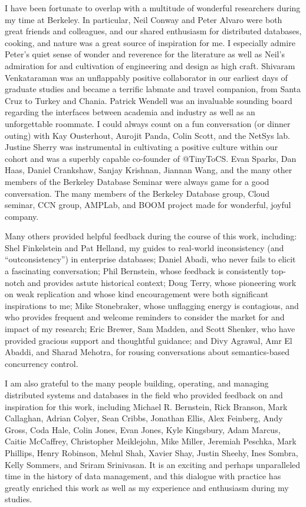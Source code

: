 \documentclass[12pt]{myucthesis}
\begin{document}
\begin{frontmatter}
\begin{acknowledgements}
I have been fortunate to overlap with a multitude of wonderful
researchers during my time at Berkeley. In particular, Neil Conway and
Peter Alvaro were both great friends and colleagues, and our shared
enthusiasm for distributed databases, cooking, and nature was a great
source of inspiration for me. I especially admire Peter's quiet sense
of wonder and reverence for the literature as well as Neil's
admiration for and cultivation of engineering and design as high
craft. Shivaram Venkataraman was an unflappably positive collaborator
in our earliest days of graduate studies and became a terrific labmate
and travel companion, from Santa Cruz to Turkey and Chania. Patrick
Wendell was an invaluable sounding board regarding the interfaces
between academia and industry as well as an unforgettable roommate. I
could always count on a fun conversation (or dinner outing) with Kay
Ousterhout, Aurojit Panda, Colin Scott, and the NetSys lab. Justine
Sherry was instrumental in cultivating a positive culture within our
cohort and was a superbly capable co-founder of @TinyToCS. Evan
Sparks, Dan Haas, Daniel Crankshaw, Sanjay Krishnan, Jiannan Wang, and
the many other members of the Berkeley Database Seminar were always
game for a good conversation. The many members of the Berkeley
Database group, Cloud seminar, CCN group, AMPLab, and BOOM project
made for wonderful, joyful company.

Many others provided helpful feedback during the course of this work,
including: Shel Finkelstein and Pat Helland, my guides to real-world
inconsistency (and ``outconsistency'') in enterprise databases; Daniel
Abadi, who never fails to elicit a fascinating conversation; Phil
Bernstein, whose feedback is consistently top-notch and provides
astute historical context; Doug Terry, whose pioneering work on weak
replication and whose kind encouragement were both significant
inspirations to me; Mike Stonebraker, whose unflagging energy is
contagious, and who provides frequent and welcome reminders
to consider the market for and impact of my research; Eric
Brewer, Sam Madden, and Scott Shenker, who have provided gracious support and
thoughtful guidance; and Divy Agrawal, Amr El Abaddi, and Sharad
Mehotra, for rousing conversations about semantics-based concurrency
control.

I am also grateful to the many people building, operating, and
managing distributed systems and databases in the field who provided
feedback on and inspiration for this work, including Michael
R. Bernstein, Rick Branson, Mark Callaghan, Adrian Colyer, Sean
Cribbs, Jonathan Ellis, Alex Feinberg, Andy Gross, Coda Hale, Colin
Jones, Evan Jones, Kyle Kingsbury, Adam Marcus, Caitie McCaffrey,
Christopher Meiklejohn, Mike Miller, Jeremiah Peschka, Mark Phillips,
Henry Robinson, Mehul Shah, Xavier Shay, Justin Sheehy, Ines Sombra,
Kelly Sommers, and Sriram Srinivasan. It is an exciting and perhaps
unparalleled time in the history of data management, and this dialogue
with practice has greatly enriched this work as well as my experience
and enthusiasm during my studies.


\end{acknowledgements}
\end{frontmatter}
\end{document}
